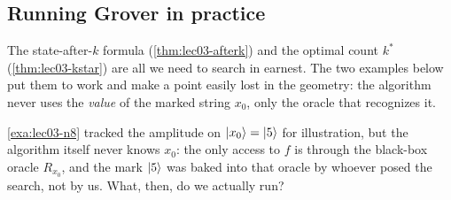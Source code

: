 \subsection{Running Grover in practice}

The state-after-$k$ formula (\cref{thm:lec03-afterk}) and the optimal count
$k^{\ast}$ (\cref{thm:lec03-kstar}) are all we need to search in earnest. The two
examples below put them to work and make a point easily lost in the geometry: the
algorithm never uses the \emph{value} of the marked string $x_0$, only the oracle
that recognizes it.

\begin{example}
\label{exa:lec03-practice}
\cref{exa:lec03-n8} tracked the amplitude on $\ket{x_0}=\ket5$ for illustration, but
the algorithm itself never knows $x_0$: the only access to $f$ is through the
black-box oracle $R_{x_0}$, and the mark $\ket5$ was baked into that oracle by
whoever posed the search, not by us. What, then, do we actually run?


\end{example}

